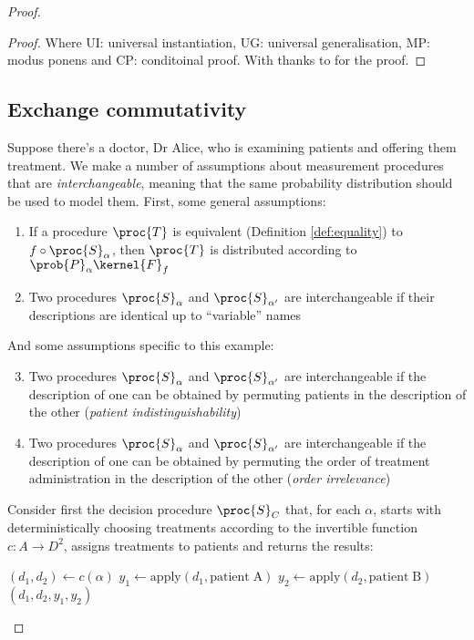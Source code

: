 \begin{proof}
\begin{proof}
Where UI: universal instantiation, UG: universal generalisation, MP: modus ponens and CP: conditoinal proof. With thanks to \citet{1377555} for the proof.
\end{proof}

\subsection{Exchange commutativity}\label{sec:exchange_commutativity}

Suppose there's a doctor, Dr Alice, who is examining patients and offering them treatment. We make a number of assumptions about measurement procedures that are \emph{interchangeable}, meaning that the same probability distribution should be used to model them. First, some general assumptions:
\begin{enumerate}
    \item If a procedure $\proc{T}$ is equivalent (Definition \ref{def:equality}) to $f\circ \proc{S}_\alpha$, then $\proc{T}$ is distributed according to $\prob{P}_\alpha\kernel{F}_f$
    \item Two procedures $\proc{S}_\alpha$ and $\proc{S}_{\alpha'}$ are interchangeable if their descriptions are identical up to ``variable'' names
\end{enumerate}

And some assumptions specific to this example:
\begin{enumerate}
    \setcounter{enumi}{2}
    \item Two procedures $\proc{S}_\alpha$ and $\proc{S}_{\alpha'}$ are interchangeable if the description of one can be obtained by permuting patients in the description of the other (\emph{patient indistinguishability})
    \item Two procedures $\proc{S}_\alpha$ and $\proc{S}_{\alpha'}$ are interchangeable if the description of one can be obtained by permuting the order of treatment administration in the description of the other (\emph{order irrelevance})
\end{enumerate}

Consider first the decision procedure $\proc{S}_C$ that, for each $\alpha$, starts with deterministically choosing treatments according to the invertible function $c:A\to D^2$, assigns treatments to patients and returns the results:

\begin{algorithmic}
    \State $(d_1,d_2) \gets c(\alpha)$
    \State $y_1\gets \mathrm{apply}(d_1,\mathrm{patient\;A})$
    \State $y_2\gets \mathrm{apply}(d_2,\mathrm{patient\;B})$
    \State \Return $(d_1,d_2,y_1,y_2)$
    \EndProcedure
\end{algorithmic}


\end{proof}
